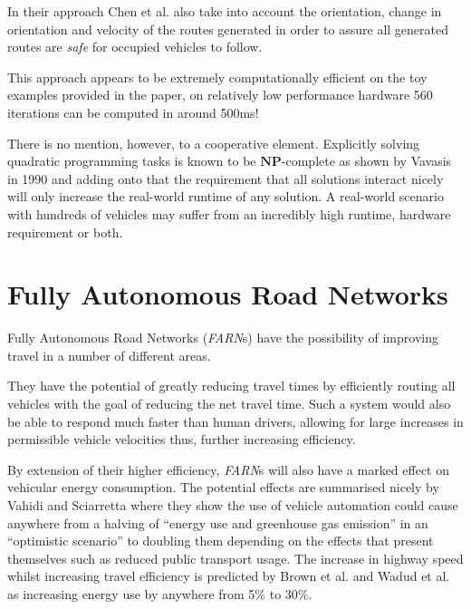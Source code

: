 In their approach Chen et al. also take into account the orientation, change in orientation and velocity of the routes generated in order to assure all generated routes are \textit{safe} for occupied vehicles to follow.

This approach appears to be extremely computationally efficient on the toy examples provided in the paper, on relatively low performance hardware 560 iterations can be computed in around 500ms!

There is no mention, however, to a cooperative element. Explicitly solving quadratic programming tasks is known to be $\mathbf{NP}$-complete as shown by Vavasis in 1990\cite{VAVASIS199073} and adding onto that the requirement that all solutions interact nicely will only increase the real-world runtime of any solution. A real-world scenario with hundreds of vehicles may suffer from an incredibly high runtime, hardware requirement or both.

\section{Fully Autonomous Road Networks}

Fully Autonomous Road Networks (\textit{FARN}s) have the possibility of improving travel in a number of different areas.

They have the potential of greatly reducing travel times by efficiently routing all vehicles with the goal of reducing the net travel time. Such a system would also be able to respond much faster than human drivers, allowing for large increases in permissible vehicle velocities thus, further increasing efficiency.

By extension of their higher efficiency, \textit{FARN}s will also have a marked effect on vehicular energy consumption. The potential effects are summarised nicely by Vahidi and Sciarretta\cite{vahidiEnergySavingPotentials2018} where they show the use of vehicle automation could cause anywhere from a halving of ``energy use and greenhouse gas emission'' in an ``optimistic scenario'' to doubling them depending on the effects that present themselves such as reduced public transport usage. The increase in highway speed whilst increasing travel efficiency is predicted by Brown et al.\cite{brownAnalysisPossibleEnergy2014} and Wadud et al.\cite{wadudHelpHindranceTravel2016} as increasing energy use by anywhere from 5\% to 30\%.


